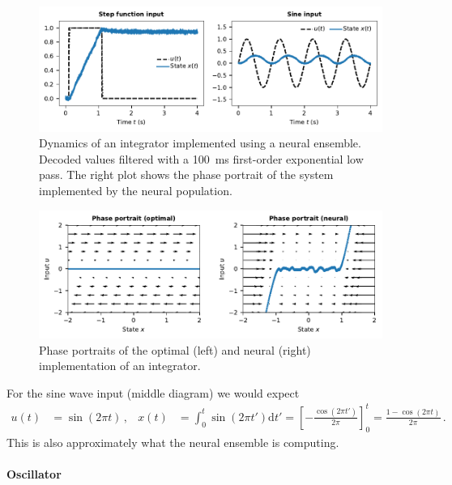 \documentclass[10pt,letterpaper,oneside]{article}
\begin{document}
\begin{figure}
	\centering
	\includegraphics{media/example_integrator.pdf}
	\caption{Dynamics of an integrator implemented using a neural ensemble. Decoded values filtered with a \SI{100}{\milli\second} first-order exponential low pass. The right plot shows the phase portrait of the system implemented by the neural population.  }
	\label{fig:example_integrator}
\end{figure}


\begin{figure}
	\centering
	\includegraphics{media/example_integrator_phases.pdf}
	\caption{Phase portraits of the optimal (left) and neural (right) implementation of an integrator. }
	\label{fig:example_integrator_phases}
\end{figure}

For the sine wave input (middle diagram) we would expect
\begin{align*}
	u(t) &= \sin(2 \pi t) \,, &
	x(t) &= \int_{0}^t \sin(2 \pi t') \mathrm{d}t' = \left[ -\frac{\cos(2 \pi t')}{2 \pi}  \right]_0^t = \frac{1 - \cos(2 \pi t)}{2 \pi} \,.
\end{align*}
This is also approximately what the neural ensemble is computing.

\paragraph{Oscillator}
\end{document}
